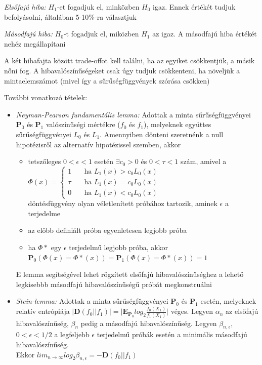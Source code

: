 \emph{Elsőfajú hiba:} $H_1$-et fogadjuk el, minközben $H_0$ igaz. Ennek értékét tudjuk befolyásolni, általában 5-10\%-ra választjuk


\emph{Másodfajú hiba:} $H_0$-t fogadjuk el, miközben $H_1$ az igaz. A másodfajú hiba értékét nehéz megállapítani

A két hibafajta között trade-offot kell találni, ha az egyiket csökkentjük, a másik nőni fog. A hibavalószínűségeket csak úgy tudjuk csökkenteni, ha növeljük a mintaelemszámot (mivel így a sűrűségfüggvények szórása csökken)

További vonatkozó tételek:
\begin{itemize}
\item \emph{Neyman-Pearson fundamentális lemma:}  Adottak a minta sűrűségfüggvényei $\mathbf{P}_0$ és $\mathbf{P}_1$ valószínűségi mértékre ($f_0$ és $f_1$), melyeknek együttes sűrűségfüggvényei $L_0$ és $L_1$. Amennyiben dönteni szeretnénk a null hipotézisről az alternatív hipotézissel szemben, akkor
\begin{itemize}
\item tetszőleges $0<\epsilon<1$ esetén $\exists c_0 >0$ és $0 < \tau < 1$ szám, amivel a \\
$\Phi(x) = 
  \begin{cases}
    1       & \quad \text{ha } L_1(x) > c_0L_0(x) \\
    \tau    & \quad \text{ha } L_1(x) = c_0L_0(x)\\
    0		& \quad \text{ha } L_1(x) < c_0L_0(x)
  \end{cases}
$
\\döntésfüggvény olyan véletlenített próbához tartozik, aminek $\epsilon$ a terjedelme
\item az előbb definiált próba egyenletesen legjobb próba
\item ha $\Phi*$ egy $\epsilon$ terjedelmű legjobb próba, akkor \\$\mathbf{P}_0(\Phi(x) = \Phi*(x))=\mathbf{P}_1(\Phi(x) = \Phi*(x))=1$
\end{itemize}
E lemma segítségével lehet rögzített elsőfajú hibavalószínűséghez a lehető legkisebbb másodfajú hibavalószínűségű próbát megkonstruálni

\item \emph{Stein-lemma:} Adottak a minta sűrűségfüggvényei $\mathbf{P}_0$ és $\mathbf{P}_1$ esetén, melyeknek relatív entrópiája $| \mathbf{D} (f_0 || f_1)| = \Big| \mathbf{E}_{\mathbf{P}_0}log_2\frac{f_0(X_1)}{f_1(X_1)} \Big|$ véges. Legyen $\alpha_n$ az elsőfajú hibavalószínűség, $\beta_n$ pedig a másodfajú hibavalószínűség. Legyen $\beta_{n,\epsilon}$, $0<\epsilon<1/2$ a legfeljebb $\epsilon$ terjedelmű próbák esetén a minimális másodfajú hibavalószínűség.\\Ekkor $lim_{n\rightarrow\infty}log_2\beta_{n,\epsilon} = - \mathbf{D} (f_0 || f_1)$
\end{itemize}

